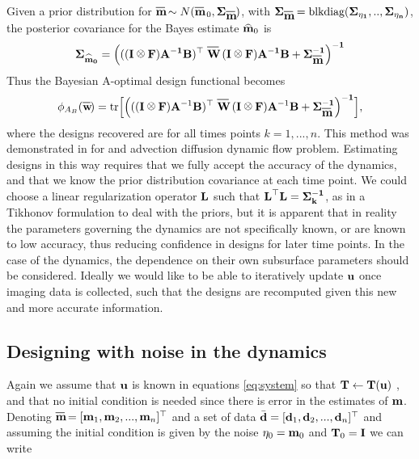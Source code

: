\documentclass[12pt]{article}
\newcommand {\bfd}   { {\bf d} }
\newcommand {\bfu}   { {\bf u} }
\newcommand {\bfm}   { {\bf m} }
\newcommand{\bA}  { {\bf A} }      %
\newcommand{\bB}  { {\bf B} }      %
\newcommand{\bI}  { {\bf I} }      %
\newcommand{\bF}  { {\bf F} }      %
\newcommand{\bT}  {\text{\bf T}} %
\newcommand{\bfW}  {\text{{\bf W}}} %
\newcommand{\bfL}  {\text{{\bf L}}} %
\newcommand{\mhat}{\widehat{\bf m}}
\newcommand{\Sig}{\bf \Sigma}
\newcommand*\xbar[1]{%
  \hbox{%
    \vbox{%
      \hrule height 0.5pt %
      \kern0.5ex%
      \hbox{%
        \kern-0.em%
        \ensuremath{#1}%
        \kern-0.15em%
      }%
    }%
  }%
}
\newcommand{\mbar}{\xbar{\bf m}}
\newcommand{\wbar}{\xbar{\bf w}}
\def\kronecker{\raisebox{1pt}{\ensuremath{\:\otimes\:}}}
\begin{document}
Given a prior distribution for $\mbar \sim N(\mbar_{\;0},\Sig_{\mbar})$, with $\Sig_{\mbar} = \text{blkdiag}(\Sig_{\eta_1},..,\Sig_{\eta_n})$, the posterior covariance for the Bayes estimate $\mhat_0$ is 
\begin{equation}
\label{noNoiseCov}
\Sig_{\mhat_0} = \Big(((\bI \kronecker \bF) \bA^{-1} \bB)^{\top}\;
\xbar{\bfW}\;(\bI \kronecker \bF) \bA^{-1} \bB + \Sig_{\mbar}^{-1}\Big)^{-1}
\end{equation}
Thus the Bayesian A-optimal design functional becomes
 \begin{equation}
  \label{AB}
  \phi_{A_B}(\wbar) = \text{tr}\Big[\Big(((\bI \kronecker \bF) \bA^{-1} \bB)^{\top}\;
\xbar{\bfW}\;(\bI \kronecker \bF) \bA^{-1} \bB + \Sig_{\mbar}^{-1}\Big)^{-1}\Big],
  \end{equation} 
where the designs recovered are for all times points $k=1,...,n$.
 This method was demonstrated in \cite{Alexanderian2014} for and advection diffusion dynamic flow problem.  Estimating designs in this way requires that we fully accept the accuracy of the dynamics, and that we know the prior distribution covariance at each time point. We could choose a linear regularization operator $\bfL$ such that $\bfL^{\top}\bfL = \Sig_k^{-1}$, as in a Tikhonov formulation to deal with the priors, but it is apparent that in reality the parameters governing the dynamics are not specifically known, or are known to low accuracy, thus reducing confidence in designs for later time points. 
In the case of the dynamics, the dependence  on their own subsurface parameters should be considered. Ideally we would like to be able to iteratively update $\bfu$ once imaging data is collected, such that the designs are recomputed given this new and more accurate information. 
%
%
%
\subsection{Designing with noise in the dynamics}
\label{constrained}
Again we assume that $\bfu$ is known in equations \eqref{eq:system} so that $ \bT \leftarrow \bT(\bfu)$ , and that no initial condition is needed since there is error in the estimates of $\bfm$. Denoting $\mbar = [\bfm_1,\bfm_2,...,\bfm_n]^{\top}$ and  a set of data $\bar{\bfd} = [\bfd_1,\bfd_2,...,\bfd_n]^{\top}$ and assuming the initial condition is given by the noise $\eta_0 = \bfm_0$ and $\bT_0 = \bI$ we can write 
\end{document}
